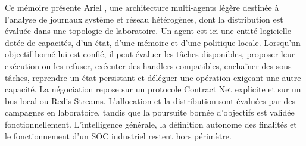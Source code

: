
Ce mémoire présente Ariel \logminer{}, une architecture multi-agents légère
destinée à l'analyse de journaux système et réseau hétérogènes, dont la
distribution est évaluée dans une topologie de laboratoire. Un agent est ici
une entité logicielle dotée de capacités, d'un état, d'une mémoire et d'une
politique locale. Lorsqu'un objectif borné lui est confié, il peut évaluer les
tâches disponibles, proposer leur exécution ou les refuser, exécuter des
handlers compatibles, enchaîner des sous-tâches, reprendre un état persistant
et déléguer une opération exigeant une autre capacité. La négociation repose
sur un protocole Contract Net explicite et sur un bus local ou Redis Streams.
L'allocation et la distribution sont évaluées par des campagnes en laboratoire,
tandis que la poursuite bornée d'objectifs est validée fonctionnellement.
L'intelligence générale, la définition autonome des finalités et le
fonctionnement d'un SOC industriel restent hors périmètre.


